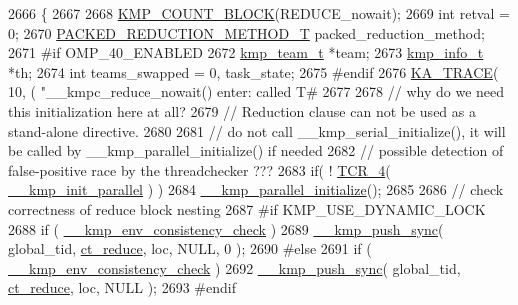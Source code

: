 \begin{DoxyCode}
2666                              \{
2667 
2668     \hyperlink{group__STATS__GATHERING_ga7fa64ec62947bf0b97f3f4778dd22196}{KMP\_COUNT\_BLOCK}(REDUCE\_nowait);
2669     \textcolor{keywordtype}{int} retval = 0;
2670     \hyperlink{kmp_8h_a79cdcd03cc0f2498719630411d56ef84}{PACKED\_REDUCTION\_METHOD\_T} packed\_reduction\_method;
2671 \textcolor{preprocessor}{#if OMP\_40\_ENABLED}
2672 \textcolor{preprocessor}{}    \hyperlink{unionkmp__team}{kmp\_team\_t} *team;
2673     \hyperlink{kmp_8h_a194859801fe16b326efe34501a37c30a}{kmp\_info\_t} *th;
2674     \textcolor{keywordtype}{int} teams\_swapped = 0, task\_state;
2675 \textcolor{preprocessor}{#endif}
2676 \textcolor{preprocessor}{}    \hyperlink{kmp__debug_8h_a21d51f37cb197aca5ffe737531678830}{KA\_TRACE}( 10, ( \textcolor{stringliteral}{"\_\_kmpc\_reduce\_nowait() enter: called T#%
2677 
2678     \textcolor{comment}{// why do we need this initialization here at all?}
2679     \textcolor{comment}{// Reduction clause can not be used as a stand-alone directive.}
2680 
2681     \textcolor{comment}{// do not call \_\_kmp\_serial\_initialize(), it will be called by \_\_kmp\_parallel\_initialize() if needed}
2682     \textcolor{comment}{// possible detection of false-positive race by the threadchecker ???}
2683     \textcolor{keywordflow}{if}( ! \hyperlink{kmp__os_8h_acd6256e4afba32d90997235fc0a38a74}{TCR\_4}( \hyperlink{kmp_8h_aa23ece0d05f38387c8a8441aaad368df}{\_\_kmp\_init\_parallel} ) )
2684         \hyperlink{kmp_8h_a9c18846c648d84276b9dd5a1d650ab04}{\_\_kmp\_parallel\_initialize}();
2685 
2686     \textcolor{comment}{// check correctness of reduce block nesting}
2687 \textcolor{preprocessor}{#if KMP\_USE\_DYNAMIC\_LOCK}
2688 \textcolor{preprocessor}{}    \textcolor{keywordflow}{if} ( \hyperlink{kmp_8h_ab4062d4f566c901230e51490a8819ba0}{\_\_kmp\_env\_consistency\_check} )
2689         \hyperlink{kmp__error_8c_a17886697972a1ad707cb5797332a7229}{\_\_kmp\_push\_sync}( global\_tid, \hyperlink{kmp_8h_a1582e7ddc609220a660d10244ef3e315a69ad53348e0bb90d6e3adee6345553ca}{ct\_reduce}, loc, NULL, 0 );
2690 \textcolor{preprocessor}{#else}
2691 \textcolor{preprocessor}{}    \textcolor{keywordflow}{if} ( \hyperlink{kmp_8h_ab4062d4f566c901230e51490a8819ba0}{\_\_kmp\_env\_consistency\_check} )
2692         \hyperlink{kmp__error_8c_a17886697972a1ad707cb5797332a7229}{\_\_kmp\_push\_sync}( global\_tid, \hyperlink{kmp_8h_a1582e7ddc609220a660d10244ef3e315a69ad53348e0bb90d6e3adee6345553ca}{ct\_reduce}, loc, NULL );
2693 \textcolor{preprocessor}{#endif}
}
\end{DoxyCode}
